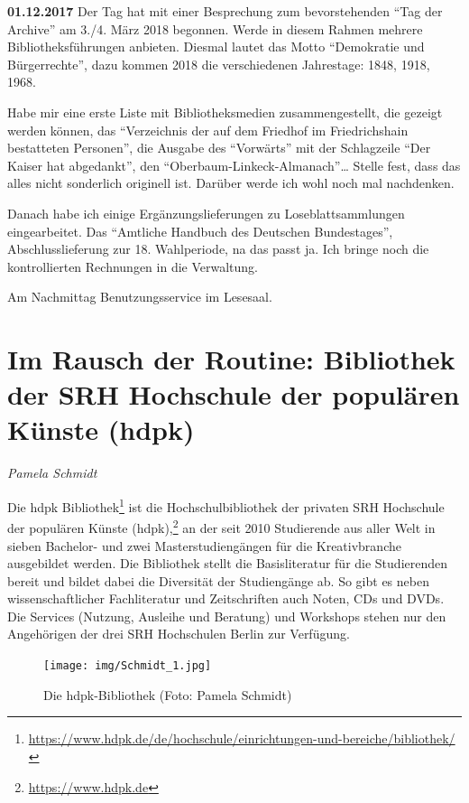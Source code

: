 \documentclass[a4paper,
fontsize=11pt,
oneside,
numbers=noperiodatend,
parskip=half-,
bibliography=totoc,
final
]{scrartcl}
\begin{document}
\textbf{01.12.2017} Der Tag hat mit einer Besprechung zum bevorstehenden
\enquote{Tag der Archive} am 3./4. März 2018 begonnen. Werde in diesem
Rahmen mehrere Bibliotheksführungen anbieten. Diesmal lautet das Motto
\enquote{Demokratie und Bürgerrechte}, dazu kommen 2018 die
verschiedenen Jahrestage: 1848, 1918, 1968.

Habe mir eine erste Liste mit Bibliotheksmedien zusammengestellt, die
gezeigt werden können, das \enquote{Verzeichnis der auf dem Friedhof im
Friedrichshain bestatteten Personen}, die Ausgabe des \enquote{Vorwärts}
mit der Schlagzeile \enquote{Der Kaiser hat abgedankt}, den
\enquote{Oberbaum-Linkeck-Almanach}\ldots{} Stelle fest, dass das alles
nicht sonderlich originell ist. Darüber werde ich wohl noch mal
nachdenken.

Danach habe ich einige Ergänzungslieferungen zu Loseblattsammlungen
eingearbeitet. Das \enquote{Amtliche Handbuch des Deutschen
Bundestages}, Abschlusslieferung zur 18. Wahlperiode, na das passt ja.
Ich bringe noch die kontrollierten Rechnungen in die Verwaltung.

Am Nachmittag Benutzungsservice im Lesesaal.

\hypertarget{im-rausch-der-routine-bibliothek-der-srh-hochschule-der-populuxe4ren-kuxfcnste-hdpk}{%
\section{Im Rausch der Routine: Bibliothek der SRH Hochschule der
populären Künste
(hdpk)}\label{im-rausch-der-routine-bibliothek-der-srh-hochschule-der-populuxe4ren-kuxfcnste-hdpk}}

\emph{Pamela Schmidt}

Die hdpk Bibliothek\footnote{\url{https://www.hdpk.de/de/hochschule/einrichtungen-und-bereiche/bibliothek/}}
ist die Hochschulbibliothek der privaten SRH Hochschule der populären
Künste (hdpk),\footnote{\url{https://www.hdpk.de}} an der seit 2010
Studierende aus aller Welt in sieben Bachelor- und zwei
Masterstudiengängen für die Kreativbranche ausgebildet werden. Die
Bibliothek stellt die Basisliteratur für die Studierenden bereit und
bildet dabei die Diversität der Studiengänge ab. So gibt es neben
wissenschaftlicher Fachliteratur und Zeitschriften auch Noten, CDs und
DVDs. Die Services (Nutzung, Ausleihe und Beratung) und Workshops stehen
nur den Angehörigen der drei SRH Hochschulen Berlin zur Verfügung.

\begin{figure}
\centering
\texttt{[image: img/Schmidt\_1.jpg]}
\caption{Die hdpk-Bibliothek (Foto: Pamela Schmidt)}
\end{figure}
\end{document}
